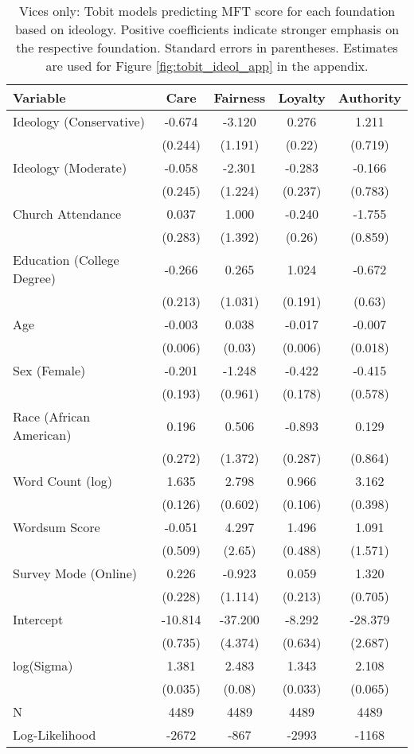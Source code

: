 \begin{table}[ht]
\centering
\caption{Vices only: Tobit models predicting MFT score for each foundation based 
           on ideology. Positive coefficients indicate stronger emphasis on the respective 
           foundation. Standard errors in parentheses. Estimates are used for 
           Figure \ref{fig:tobit_ideol_app} in the appendix.} 
\label{tab:tobit_vice}
\begingroup\footnotesize
\begin{tabular}{lcccc}
  \hline
Variable & Care & Fairness & Loyalty & Authority \\ 
  \hline
Ideology (Conservative) &  -0.674 &  -3.120 &  0.276 &   1.211 \\ 
   & (0.244) & (1.191) & (0.22) & (0.719) \\ 
  Ideology (Moderate) &  -0.058 &  -2.301 & -0.283 &  -0.166 \\ 
   & (0.245) & (1.224) & (0.237) & (0.783) \\ 
  Church Attendance &   0.037 &   1.000 & -0.240 &  -1.755 \\ 
   & (0.283) & (1.392) & (0.26) & (0.859) \\ 
  Education (College Degree) &  -0.266 &   0.265 &  1.024 &  -0.672 \\ 
   & (0.213) & (1.031) & (0.191) & (0.63) \\ 
  Age &  -0.003 &   0.038 & -0.017 &  -0.007 \\ 
   & (0.006) & (0.03) & (0.006) & (0.018) \\ 
  Sex (Female) &  -0.201 &  -1.248 & -0.422 &  -0.415 \\ 
   & (0.193) & (0.961) & (0.178) & (0.578) \\ 
  Race (African American) &   0.196 &   0.506 & -0.893 &   0.129 \\ 
   & (0.272) & (1.372) & (0.287) & (0.864) \\ 
  Word Count (log) &   1.635 &   2.798 &  0.966 &   3.162 \\ 
   & (0.126) & (0.602) & (0.106) & (0.398) \\ 
  Wordsum Score &  -0.051 &   4.297 &  1.496 &   1.091 \\ 
   & (0.509) & (2.65) & (0.488) & (1.571) \\ 
  Survey Mode (Online) &   0.226 &  -0.923 &  0.059 &   1.320 \\ 
   & (0.228) & (1.114) & (0.213) & (0.705) \\ 
  Intercept & -10.814 & -37.200 & -8.292 & -28.379 \\ 
   & (0.735) & (4.374) & (0.634) & (2.687) \\ 
  log(Sigma) &   1.381 &   2.483 &  1.343 &   2.108 \\ 
   & (0.035) & (0.08) & (0.033) & (0.065) \\ 
   \hline
N & 4489 & 4489 & 4489 & 4489 \\ 
  Log-Likelihood & -2672 & -867 & -2993 & -1168 \\ 
   \hline
\end{tabular}
\endgroup
\end{table}
